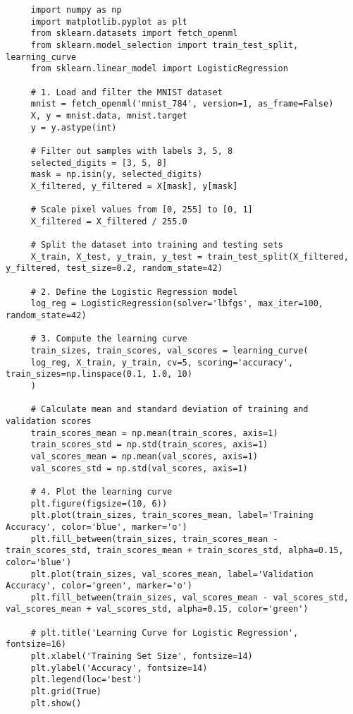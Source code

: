 \documentclass[letterpaper]{article}
\begin{document}
\begin{lstlisting}
     import numpy as np
     import matplotlib.pyplot as plt
     from sklearn.datasets import fetch_openml
     from sklearn.model_selection import train_test_split, learning_curve
     from sklearn.linear_model import LogisticRegression
     
     # 1. Load and filter the MNIST dataset
     mnist = fetch_openml('mnist_784', version=1, as_frame=False)
     X, y = mnist.data, mnist.target
     y = y.astype(int)
     
     # Filter out samples with labels 3, 5, 8
     selected_digits = [3, 5, 8]
     mask = np.isin(y, selected_digits)
     X_filtered, y_filtered = X[mask], y[mask]
     
     # Scale pixel values from [0, 255] to [0, 1]
     X_filtered = X_filtered / 255.0
     
     # Split the dataset into training and testing sets
     X_train, X_test, y_train, y_test = train_test_split(X_filtered, y_filtered, test_size=0.2, random_state=42)
     
     # 2. Define the Logistic Regression model
     log_reg = LogisticRegression(solver='lbfgs', max_iter=100, random_state=42)
     
     # 3. Compute the learning curve
     train_sizes, train_scores, val_scores = learning_curve(
     log_reg, X_train, y_train, cv=5, scoring='accuracy', train_sizes=np.linspace(0.1, 1.0, 10)
     )
     
     # Calculate mean and standard deviation of training and validation scores
     train_scores_mean = np.mean(train_scores, axis=1)
     train_scores_std = np.std(train_scores, axis=1)
     val_scores_mean = np.mean(val_scores, axis=1)
     val_scores_std = np.std(val_scores, axis=1)
     
     # 4. Plot the learning curve
     plt.figure(figsize=(10, 6))
     plt.plot(train_sizes, train_scores_mean, label='Training Accuracy', color='blue', marker='o')
     plt.fill_between(train_sizes, train_scores_mean - train_scores_std, train_scores_mean + train_scores_std, alpha=0.15, color='blue')
     plt.plot(train_sizes, val_scores_mean, label='Validation Accuracy', color='green', marker='o')
     plt.fill_between(train_sizes, val_scores_mean - val_scores_std, val_scores_mean + val_scores_std, alpha=0.15, color='green')
     
     # plt.title('Learning Curve for Logistic Regression', fontsize=16)
     plt.xlabel('Training Set Size', fontsize=14)
     plt.ylabel('Accuracy', fontsize=14)
     plt.legend(loc='best')
     plt.grid(True)
     plt.show()
\end{lstlisting}
\end{document}
